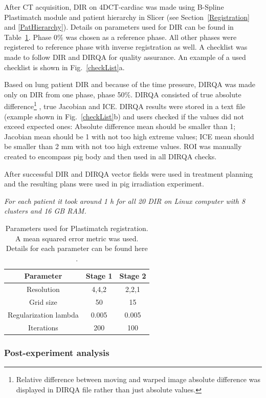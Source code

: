 \documentclass[type=dr, dr=rernat, accentcolor=tud7b,colorbacktitle, bigchapter, openright, twoside, 12pt ]{tudthesis}
\begin{document}
After CT acquisition, DIR on 4DCT-cardiac was made using B-Spline Plastimatch module and patient hierarchy in Slicer (see Section~\ref{Registration} and \ref{PatHierarchy}). Details on parameters used for DIR can be found in Table~\ref{tab:stages2}. 
Phase 0\% was chosen as a reference phase. All other phases were registered to reference phase with inverse registration as well. A checklist was made to follow DIR and DIRQA for quality assurance. An example of a used checklist is shown in Fig.~\ref{checkList}a.

Based on lung patient DIR and because of the time pressure, DIRQA was made only on DIR from one phase, phase 50\%. DIRQA consisted of true absolute difference\footnote{Relative difference between moving and warped image absolute difference was displayed in DIRQA file rather than just absolute values.} 
, true Jacobian and ICE. DIRQA results were stored in a text file (example shown in Fig.~\ref{checkList}b) and users checked if the values did not exceed expected ones: Absolute difference
mean should be smaller than 1; Jacobian mean should be 1 with not too high extreme values; ICE mean should be smaller than 2 mm with not too high extreme values. ROI was manually created to encompass pig body and then used in all DIRQA checks.

After successful DIR and DIRQA vector fields were used in treatment planning and the resulting plans were used in pig irradiation experiment.

\textit{For each patient it took around 1 h for all 20 DIR on Linux computer with 8 clusters and 16 GB RAM.}

\begin{table}[H]
  \centering
  \caption{Parameters used for Plastimatch registration.  A mean squared error metric was used. Details for each parameter can be found here \cite{Plastimatch}.}
  \begin{tabular}{c|c|c}
      Parameter & Stage 1 & Stage 2 \\
      \hline
      Resolution & 4,4,2 & 2,2,1 \\
      Grid size & 50 & 15 \\
      Regularization lambda & 0.005 & 0.005 \\
      Iterations & 200 & 100 \\
    \hline\hline
  \end{tabular}
  \label{tab:stages2}
\end{table}

\subsubsection{Post-experiment analysis}
\end{document}
